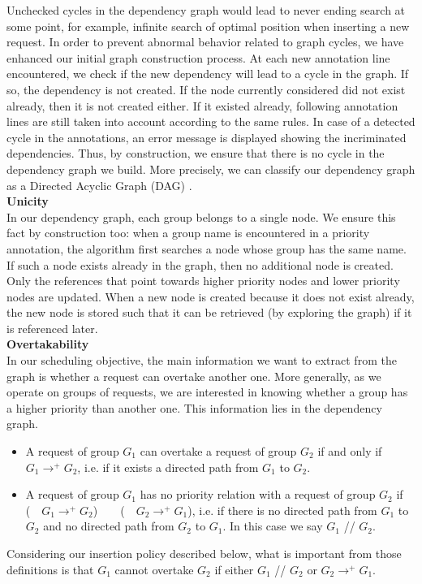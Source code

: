 \documentclass[11pt]{report}
\begin{document}
Unchecked cycles in the dependency graph would lead to never ending search at some point, for example, infinite search of optimal position when inserting a new request. In order to prevent abnormal behavior related to graph cycles, we have enhanced our initial graph construction process. At each new annotation line encountered, we check if the new dependency will lead to a cycle in the graph. If so, the dependency is not created. If the node currently considered did not exist already, then it is not created either. If it existed already, following annotation lines are still taken into account according to the same rules. In case of a detected cycle in the annotations, an error message is displayed showing the incriminated dependencies. Thus, by construction, we ensure that there is no cycle in the dependency graph we build. More precisely, we can classify our dependency graph as a Directed Acyclic Graph (DAG) \cite{ref:gallai1968directed}.\\

\textbf{Unicity}\\
In our dependency graph, each group belongs to a single node. We ensure this fact by construction too: when a group name is encountered in a priority annotation, the algorithm first searches a node whose group has the same name. If such a node exists already in the graph, then no additional node is created. Only the references that point towards higher priority nodes and lower priority nodes are updated. When a new node is created because it does not exist already, the new node is stored such that it can be retrieved (by exploring the graph) if it is referenced later.\\

\textbf{Overtakability}\\
In our scheduling objective, the main information we want to extract from the graph is whether a request can overtake another one. More generally, as we operate on groups of requests, we are interested in knowing whether a group has a higher priority than another one. This information lies in the dependency graph.
\begin{itemize}
\item A request of group $G_1$ can overtake a request of group $G_2$ if and only if $G_1\longrightarrow^{+}G_2$, i.e. if it exists a directed path from $G_1$ to $G_2$.
\item A request of group $G_1$ has no priority relation with a request of group $G_2$ if (\lnot~\ $G_1\longrightarrow^{+}G_2$)~\ \wedge~\  (\lnot~\ $G_2\longrightarrow^{+}G_1$), i.e. if there is no directed path from $G_1$ to $G_2$ and no directed path from $G_2$ to $G_1$. In this case we say $G_1$ // $G_2$.
\end{itemize}
Considering our insertion policy described below, what is important from those definitions is that $G_1$ cannot overtake $G_2$ if either $G_1$ // $G_2$ or $G_2\longrightarrow^{+}G_1$.\\
\end{document}
